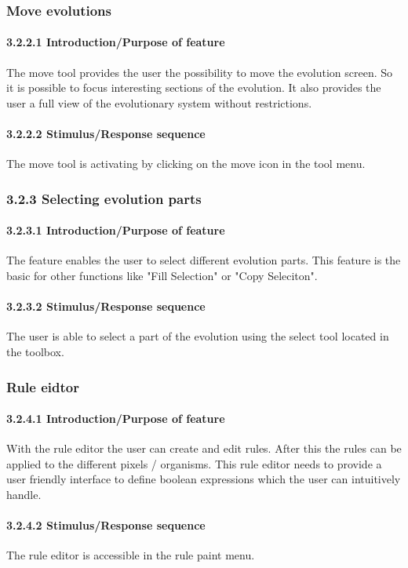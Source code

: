\documentclass[titlepage,12pt]{scrartcl}
\begin{document}
\subsubsection{Move evolutions}
\paragraph{3.2.2.1	Introduction/Purpose of feature}
The move tool provides the user the possibility to move the evolution screen. So it is possible to focus interesting sections of the evolution. It also provides the user a full view of the evolutionary system without restrictions.
\paragraph{3.2.2.2	Stimulus/Response sequence}
The move tool is activating by clicking on the move icon in the tool menu.


\subsubsection{3.2.3	Selecting evolution parts}
\paragraph{3.2.3.1	Introduction/Purpose of feature}
The feature enables the user to select different evolution parts. This feature is the basic for other functions like "Fill Selection" or "Copy Seleciton".
\paragraph{3.2.3.2	Stimulus/Response sequence}
The user is able to select a part of the evolution using the select tool located in the toolbox.

\subsubsection{Rule eidtor}
\paragraph{3.2.4.1	Introduction/Purpose of feature}
With the rule editor the user can create and edit rules. After this the rules can be applied to the different pixels / organisms. This rule editor needs to provide a user friendly interface to define boolean expressions which the user can intuitively handle. 
\paragraph{3.2.4.2	Stimulus/Response sequence}
The rule editor is accessible in the rule paint menu.
\end{document}
